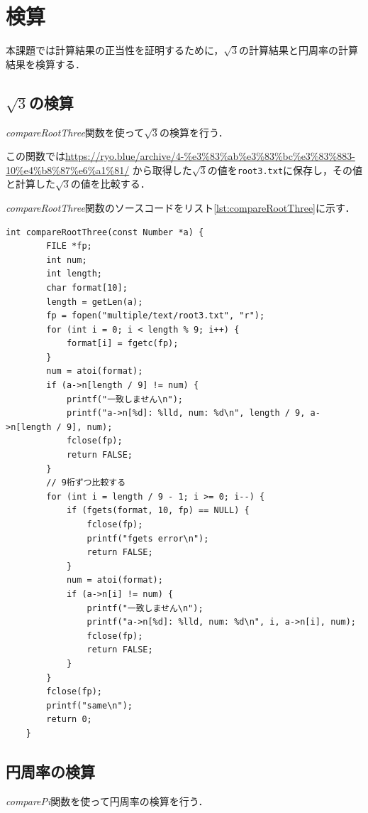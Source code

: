 \documentclass[a4paper,11pt,dvipdfmx]{jsarticle}
\begin{document}
\section{検算}
\label{sec:verification}

本課題では計算結果の正当性を証明するために，$\sqrt{3}$の計算結果と円周率の計算結果を検算する．

\subsection{$\sqrt{3}$の検算}
\textit{compareRootThree}関数を使って$\sqrt{3}$の検算を行う．

この関数では\url{https://ryo.blue/archive/4-%e3%83%ab%e3%83%bc%e3%83%883-10%e4%b8%87%e6%a1%81/}
から取得した$\sqrt{3}$の値を\texttt{root3.txt}に保存し，その値と計算した$\sqrt{3}$の値を比較する．


\textit{compareRootThree}関数のソースコードをリスト\ref{lst:compareRootThree}に示す．

\begin{lstlisting}[caption=\texttt{compareRootThree}関数,label=lst:compareRootThree]
    int compareRootThree(const Number *a) {
        FILE *fp;
        int num;
        int length;
        char format[10];
        length = getLen(a);
        fp = fopen("multiple/text/root3.txt", "r");
        for (int i = 0; i < length % 9; i++) {
            format[i] = fgetc(fp);
        }
        num = atoi(format);
        if (a->n[length / 9] != num) {
            printf("一致しません\n");
            printf("a->n[%d]: %lld, num: %d\n", length / 9, a->n[length / 9], num);
            fclose(fp);
            return FALSE;
        }
        // 9桁ずつ比較する
        for (int i = length / 9 - 1; i >= 0; i--) {
            if (fgets(format, 10, fp) == NULL) {
                fclose(fp);
                printf("fgets error\n");
                return FALSE;
            }
            num = atoi(format);
            if (a->n[i] != num) {
                printf("一致しません\n");
                printf("a->n[%d]: %lld, num: %d\n", i, a->n[i], num);
                fclose(fp);
                return FALSE;
            }
        }
        fclose(fp);
        printf("same\n");
        return 0;
    }
\end{lstlisting}

\subsection{円周率の検算}
\textit{comparePi}関数を使って円周率の検算を行う．
\end{document}
